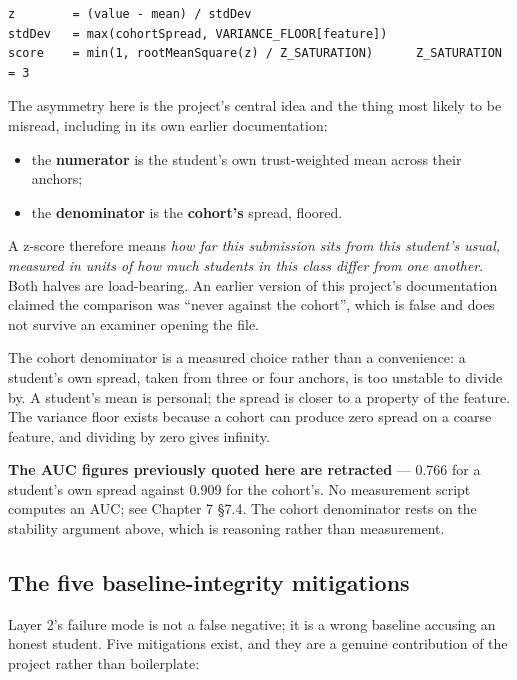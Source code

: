 \begin{verbatim}
z        = (value - mean) / stdDev
stdDev   = max(cohortSpread, VARIANCE_FLOOR[feature])
score    = min(1, rootMeanSquare(z) / Z_SATURATION)      Z_SATURATION = 3
\end{verbatim}

The asymmetry here is the project's central idea and the thing most
likely to be misread, including in its own earlier documentation:

\begin{itemize}
\tightlist
\item
  the \textbf{numerator} is the student's own trust-weighted mean across
  their anchors;
\item
  the \textbf{denominator} is the \textbf{cohort's} spread, floored.
\end{itemize}

A z-score therefore means \emph{how far this submission sits from this
student's usual, measured in units of how much students in this class
differ from one another}. Both halves are load-bearing. An earlier
version of this project's documentation claimed the comparison was
``never against the cohort'', which is false and does not survive an
examiner opening the file.

The cohort denominator is a measured choice rather than a convenience: a
student's own spread, taken from three or four anchors, is too unstable
to divide by. A student's mean is personal; the spread is closer to a
property of the feature. The variance floor exists because a cohort can
produce zero spread on a coarse feature, and dividing by zero gives
infinity.

\textbf{The AUC figures previously quoted here are retracted} --- 0.766
for a student's own spread against 0.909 for the cohort's. No
measurement script computes an AUC; see Chapter 7 \S{}7.4. The cohort
denominator rests on the stability argument above, which is reasoning
rather than measurement.

\hypertarget{the-five-baseline-integrity-mitigations}{%
\subsection{The five baseline-integrity
mitigations}\label{the-five-baseline-integrity-mitigations}}

Layer 2's failure mode is not a false negative; it is a wrong baseline
accusing an honest student. Five mitigations exist, and they are a
genuine contribution of the project rather than boilerplate:

